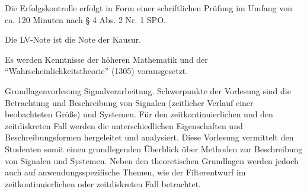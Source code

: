 \begin{course}

\setdoclanguagegerman
{}



\coursehead


\label{cour_7991.dp_997}


\begin{styleenv}
\begin{assessment}
Die Erfolgskontrolle erfolgt in Form einer schriftlichen Prüfung im Umfang von ca. 120 Minuten nach § 4 Abs. 2 Nr. 1 SPO.

 

Die LV-Note ist die Note der Kausur.


\end{assessment}

\begin{conditions}Es werden Kenntnisse der höheren Mathematik und der “Wahrscheinlichkeitstheorie” (1305) vorausgesetzt.

\end{conditions}


\end{styleenv}

\begin{learningoutcomes}
Grundlagenvorlesung Signalverarbeitung. Schwerpunkte der Vorlesung sind die Betrachtung und Beschreibung von Signalen (zeitlicher Verlauf einer beobachteten Größe) und Systemen. Für den zeitkontinuierlichen und den zeitdiskreten Fall werden die unterschiedlichen Eigenschaften und Beschreibungsformen hergeleitet und analysiert. \newline
Diese Vorlesung vermittelt den Studenten somit einen grundlegenden Überblick über Methoden zur Beschreibung von Signalen und Systemen. Neben den theoretischen Grundlagen werden jedoch auch auf anwendungsspezifische Themen, wie der Filterentwurf im zeitkontinuierlichen oder zeitdiskreten Fall betrachtet.



\end{learningoutcomes}
\end{course}
